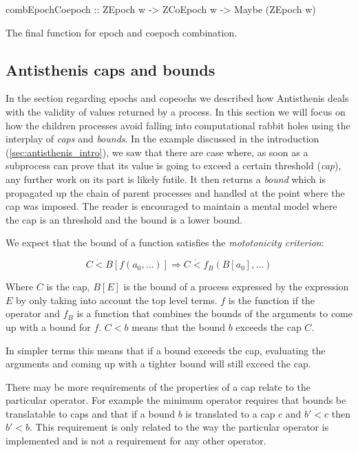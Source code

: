 \begin{code}
\begin{haskellcode}
combEpochCoepoch :: ZEpoch w -> ZCoEpoch w -> Maybe (ZEpoch w)
\end{haskellcode}
  \caption{\label{lst:comb_epoch_coepoch}The final function for epoch
    and coepoch combination.}
\end{code}

\subsection{Antisthenis caps and bounds}
\label{sec:caps_and_bounds}

In the section regarding epochs and copeochs we described how
Antisthenis deals with the validity of values returned by a
process. In this section we will focus on how the children processes
avoid falling into computational rabbit holes using the interplay of
\emph{caps} and \emph{bounds}.  In the example discussed in the
introduction (\ref{sec:antisthenis_intro}), we saw that there are case
where, as soon as a subprocess can prove that its value is going to
exceed a certain threshold (\emph{cap}), any further work on its part
is likely futile. It then returns a \emph{bound} which is propagated
up the chain of parent processes and handled at the point where the
cap was imposed. The reader is encouraged to maintain a mental model
where the cap is an threshold and the bound is a lower bound.

We expect that the bound of a function satisfies the
\emph{mototonicity criterion}:

\[
C \dot{<} B[ f(a_0, ...)] \Rightarrow C \dot{<} f_B(B[a_0],...)
\]

Where \(C\) is the cap, \(B[E]\) is the bound of a process expressed
by the expression \(E\) by only taking into account the top level
terms. \(f\) is the function if the operator and \(f_B\) is a function
that combines the bounds of the arguments to come up with a bound for
\(f\). \(C \dot{<} b\) means that the bound \(b\) exceeds the cap
\(C\).

In simpler terms this means that if a bound exceeds the cap,
evaluating the arguments and coming up with a tighter bound will still
exceed the cap.

There may be more requirements of the properties of a cap relate to
the particular operator. For example the minimum operator requires
that bounds be translatable to caps and that if a bound \(b\) is
translated to a cap \(c\) and \(b' \dot{<} c\) then \(b' < b\). This
requirement is only related to the way the particular operator is
implemented and is not a requirement for any other operator.



